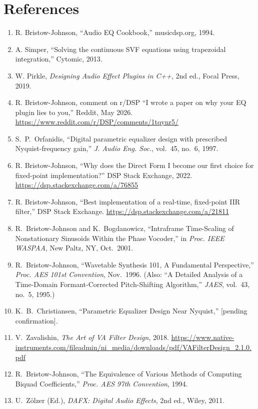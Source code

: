 \documentclass[twoside,a4paper]{article}
\begin{document}
\section*{References}
\begin{enumerate}
\item R. Bristow-Johnson, ``Audio EQ Cookbook,'' musicdsp.org, 1994.
\item A. Simper, ``Solving the continuous SVF equations using trapezoidal integration,'' Cytomic, 2013.
\item W. Pirkle, \textit{Designing Audio Effect Plugins in C++}, 2nd ed., Focal Press, 2019.
\item R. Bristow-Johnson, comment on r/DSP ``I wrote a paper on why your EQ plugin lies to you,'' Reddit, May 2026. \url{https://www.reddit.com/r/DSP/comments/1tqynr5/}
\item S.~P.~Orfanidis, ``Digital parametric equalizer design with prescribed Nyquist-frequency gain,'' \textit{J. Audio Eng. Soc.}, vol.~45, no.~6, 1997.
\item R. Bristow-Johnson, ``Why does the Direct Form I become our first choice for fixed-point implementation?'' DSP Stack Exchange, 2022. \url{https://dsp.stackexchange.com/a/76855}
\item R. Bristow-Johnson, ``Best implementation of a real-time, fixed-point IIR filter,'' DSP Stack Exchange. \url{https://dsp.stackexchange.com/a/21811}
\item R.~Bristow-Johnson and K.~Bogdanowicz, ``Intraframe Time-Scaling of Nonstationary Sinusoids Within the Phase Vocoder,'' in \textit{Proc. IEEE WASPAA}, New Paltz, NY, Oct.\ 2001.
\item R.~Bristow-Johnson, ``Wavetable Synthesis 101, A Fundamental Perspective,'' \textit{Proc. AES 101st Convention}, Nov.\ 1996. (Also: ``A Detailed Analysis of a Time-Domain Formant-Corrected Pitch-Shifting Algorithm,'' \textit{JAES}, vol.~43, no.~5, 1995.)
\item K.~B.~Christiansen, ``Parametric Equalizer Design Near Nyquist,'' [pending confirmation].
\item V.~Zavalishin, \textit{The Art of VA Filter Design}, 2018. \url{https://www.native-instruments.com/fileadmin/ni_media/downloads/pdf/VAFilterDesign_2.1.0.pdf}
\item R.~Bristow-Johnson, ``The Equivalence of Various Methods of Computing Biquad Coefficients,'' \textit{Proc. AES 97th Convention}, 1994.
\item U.~Z{\"o}lzer (Ed.), \textit{DAFX: Digital Audio Effects}, 2nd ed., Wiley, 2011.
\end{enumerate}
\end{document}
